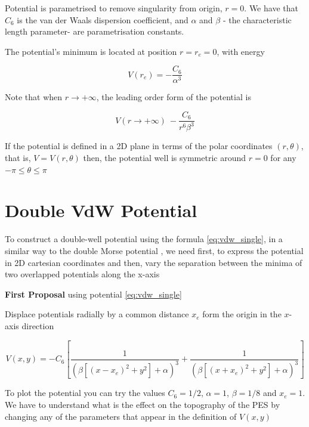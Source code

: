 \documentclass[10pt,aps,onecolumn,superscriptaddress]{revtex4-2}
\begin{document}
Potential is parametrised to remove singularity from origin, $r = 0$. We have that $C_6$ is the van der Waals dispersion coefficient, and $\alpha$ and $\beta$  - the characteristic length parameter- are parametrisation constants.

The potential's minimum is located at position $r = r_e = 0$, with energy 

\begin{equation*}
    V\left( r_e \right) = - \frac{C_6}{\alpha^3}
\end{equation*}

Note that when $r \longrightarrow +\infty $, the leading order form of the potential is

\begin{equation*}
    V(r \longrightarrow +\infty) ~ - \frac{C_6}{r^6 \beta^3}
\end{equation*}

If the potential is defined in a 2D plane in terms of the polar coordinates $(r, \theta)$, that is, $V = V(r, \theta)$ then, the potential well is symmetric around $r = 0$ for any $ -\pi \leq \theta \leq \pi$

\section{Double VdW Potential}

To construct a double-well potential using the formula \eqref{eq:vdw_single}, in a similar way to the double Morse potential \cite{GonzalezMontoya2020}, we need first, to express the potential in 2D cartesian coordinates and then, vary the separation between the minima of two overlapped potentials along the x-axis

\textbf{First Proposal} using potential \eqref{eq:vdw_single}

Displace potentials radially by a common distance $x_e$ form the origin in the $x$-axis direction




\begin{equation}
    V(x, y) = -C_6 \left[ \dfrac{1}{\left(\beta\left[\left(x - x_e\right)^2 + y^2\right] + \alpha\right)^3} + \dfrac{1}{\left(\beta\left[\left(x + x_e\right)^2 + y^2\right] + \alpha\right)^3} \right]
\end{equation}

To plot the potential you can try the values $C_6 = 1/2$, $\alpha = 1$, $\beta = 1/8$ and $x_e = 1$. We have to understand what is the effect on the topography of the PES by changing any of the parameters that appear in the definition of $V(x,y)$
\end{document}
